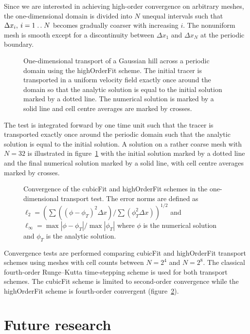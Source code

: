 \documentclass[a4paper,11pt]{article}
\newcommand{\isep}{\mathrel{{.}\,{.}}\nobreak}
\begin{document}
Since we are interested in achieving high-order convergence on arbitrary meshes, the one-dimensional domain is divided into $N$ unequal intervals such that $\Delta x_i, \: i = 1\isep N$ becomes gradually coarser with increasing $i$.  The nonuniform mesh is smooth except for a discontinuity between $\Delta x_1$ and $\Delta x_N$ at the periodic boundary.

\begin{figure}
	\centering
	
	\caption{One-dimensional transport of a Gaussian hill across a periodic domain using the highOrderFit scheme.  The initial tracer is transported in a uniform velocity field exactly once around the domain so that the analytic solution is equal to the initial solution marked by a dotted line.  The numerical solution is marked by a solid line and cell centre averages are marked by crosses.}
	\label{fig:advect1D-tracer}
\end{figure}

The test is integrated forward by one time unit such that the tracer is transported exactly once around the periodic domain such that the analytic solution is equal to the initial solution.  A solution on a rather coarse mesh with $N = 32$ is illustrated in figure~\ref{fig:advect1D-tracer} with the initial solution marked by a dotted line and the final numerical solution marked by a solid line, with cell centre averages marked by crosses.

\begin{figure}
	\centering
	
	\caption{Convergence of the cubicFit and highOrderFit schemes in the one-dimensional transport test.
	The error norms are defined as $\ell_2 = \left( \sum \left( \left( \phi - \phi_T \right)^2 \Delta x \right) / \sum \left( \phi_T^2 \Delta x \right)\right)^{1/2}$ and $\ell_\infty = \max \left| \phi - \phi_T \right| / \max \left| \phi_T \right|$ where $\phi$ is the numerical solution and $\phi_T$ is the analytic solution.}
	\label{fig:advect1D-convergence}
\end{figure}

Convergence tests are performed comparing cubicFit and highOrderFit transport schemes using meshes with cell counts between $N = 2^4$ and $N = 2^8$.  The classical fourth-order Runge--Kutta time-stepping scheme \citep[p. 53]{durran2013} is used for both transport schemes.  The cubicFit scheme is limited to second-order convergence while the highOrderFit scheme is fourth-order convergent (figure~\ref{fig:advect1D-convergence}).

\section{Future research}
\end{document}
